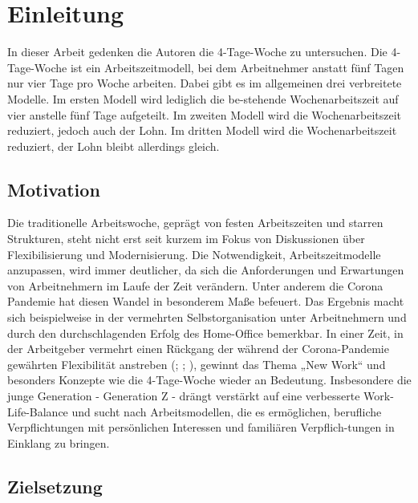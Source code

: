 \chapter{Einleitung}

In dieser Arbeit gedenken die Autoren die 4-Tage-Woche zu untersuchen. 
Die 4-Tage-Woche ist ein Arbeitszeitmodell, bei dem Arbeitnehmer anstatt fünf Tagen nur vier Tage pro Woche arbeiten. 
Dabei gibt es im allgemeinen drei verbreitete Modelle. Im ersten Modell wird lediglich die be-stehende Wochenarbeitszeit auf vier anstelle fünf Tage aufgeteilt. 
Im zweiten Modell wird die Wochenarbeitszeit reduziert, jedoch auch der Lohn. Im dritten Modell wird die Wochenarbeitszeit reduziert, der Lohn bleibt allerdings gleich. \parencite[vgl.][]{habdank_deutscher_2024}

\section{Motivation}

Die traditionelle Arbeitswoche, geprägt von festen Arbeitszeiten und starren Strukturen, steht nicht erst seit kurzem im Fokus von 
Diskussionen über Flexibilisierung und Modernisierung. Die Notwendigkeit, Arbeitszeitmodelle anzupassen, wird immer deutlicher, da sich 
die Anforderungen und Erwartungen von Arbeitnehmern im Laufe der Zeit verändern. Unter anderem die Corona Pandemie hat diesen Wandel in 
besonderem Maße befeuert. Das Ergebnis macht sich beispielweise in der vermehrten Selbstorganisation unter Arbeitnehmern und durch den 
durchschlagenden Erfolg des Home-Office bemerkbar. \parencite[vgl.][S. 73]{haide_arbeitswelt_2022}
In einer Zeit, in der Arbeitgeber vermehrt einen Rückgang der während der Corona-Pandemie gewährten Flexibilität anstreben (\cite{elias_googles_2023}; \cite{lee_apple_2022}; \cite{vanian_meta_2023}), 
gewinnt das Thema „New Work“ und besonders Konzepte wie die 4-Tage-Woche wieder an Bedeutung.
Insbesondere die junge Generation - Generation Z - drängt verstärkt auf eine verbesserte Work-Life-Balance und sucht nach Arbeitsmodellen, 
die es ermöglichen, berufliche Verpflichtungen mit persönlichen Interessen und familiären Verpflich-tungen in Einklang zu bringen. \parencite[vgl.][S. 10]{onlyfy_wechselwilligkeitsstudie_2023}

\section{Zielsetzung}

